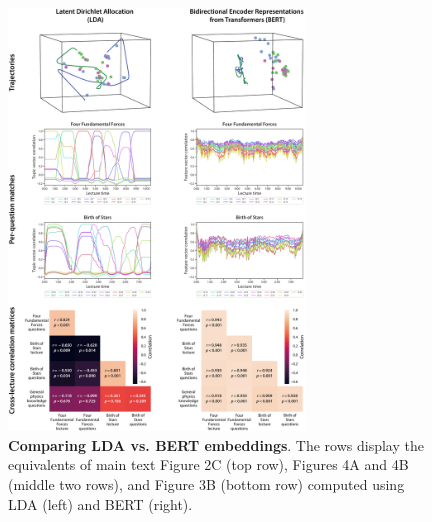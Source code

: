 \documentclass[10pt]{article}
\begin{document}
\begin{figure}[tp]
    \centering
    \includegraphics[width=0.7\textwidth]{figs/model-comparison}

    \caption{\textbf{Comparing LDA vs. BERT embeddings}. The rows display the
    equivalents of main text Figure 2C (top row), Figures 4A and 4B (middle two
    rows), and Figure 3B (bottom row) computed using LDA (left) and BERT
    (right).}

    \label{fig:compare-bert}
\end{figure}



\newpage
\end{document}
